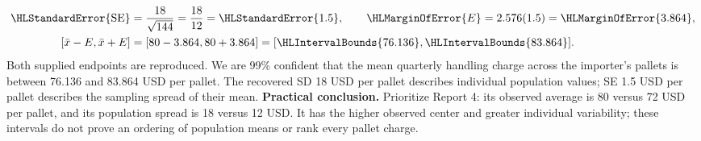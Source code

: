 \[\begin{aligned}
\HLStandardError{\mathrm{SE}}&=\frac{18}{\sqrt{144}}=\frac{18}{12}=\HLStandardError{1.5},\qquad \HLMarginOfError{E}=2.576(1.5)=\HLMarginOfError{3.864},\\
[\bar x-E,\bar x+E]&=[80-3.864,80+3.864]=[\HLIntervalBounds{76.136},\HLIntervalBounds{83.864}].
\end{aligned}\]
Both supplied endpoints are reproduced. We are 99\% confident that the mean quarterly handling charge across the importer's pallets is between 76.136 and 83.864 USD per pallet.
The recovered SD 18 USD per pallet describes individual population values; SE 1.5 USD per pallet describes the sampling spread of their mean.
\textbf{Practical conclusion.} Prioritize Report 4: its observed average is 80 versus 72 USD per pallet, and its population spread is 18 versus 12 USD. It has the higher observed center and greater individual variability; these intervals do not prove an ordering of population means or rank every pallet charge.
\endgroup
{}
\clearpage
